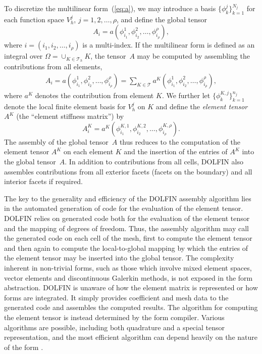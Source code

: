 \documentclass[acmtoms]{acmtrans2m}
\newcommand{\dolfin}{DOLFIN}
\begin{document}
To discretize the multilinear form~(\ref{eq:a}), we may introduce a
basis $\{\phi^j_k\}_{k=1}^{N_j}$ for each function space $V^{j}_{h}$,
$j=1, 2, \ldots, \rho$, and define the global tensor
\begin{equation}
  A_i = a(\phi_{i_1}^1, \phi_{i_2}^2, \dots,
  \phi_{i_{\rho}}^{\rho}),
\end{equation}
where $i = (i_1, i_2, \dots, i_{\rho})$ is a multi-index.  If the
multilinear form is defined as an integral over $\Omega =
\cup_{K\in\mathcal{T}_h} K$, the tensor~$A$ may be computed by
assembling the contributions from all elements,
\begin{align}
  A_{i} = a(\phi_{i_1}^1, \phi_{i_2}^2, \dots,
  \phi_{i_{\rho}}^{\rho})
  = \sum_{K \in \mathcal{T}} a^K(\phi_{i_1}^1,
  \phi_{i_2}^2, \dots, \phi_{i_{\rho}}^{\rho}),
\end{align}
where $a^K$ denotes the contribution from element $K$. We further let
$\{\phi_k^{K,j}\}_{k=1}^{n_j}$ denote the local finite element basis
for $V^j_h$ on $K$ and define the \emph{element tensor}~$A^K$ (the
``element stiffness matrix'') by
\begin{equation}
  A_i^K = a^K(\phi_{i_1}^{K, 1},
  \phi_{i_2}^{K, 2}, \dots, \phi_{i_{\rho}}^{K, \rho}).
\end{equation}
The assembly of the global tensor~$A$ thus reduces to the computation
of the element tensor $A^K$ on each element $K$ and the insertion of
the entries of $A^K$ into the global tensor~$A$.
In addition to contributions from all cells, \dolfin{} also assembles
contributions from all exterior facets (facets on the boundary)
and all interior facets if required.

The key to the generality and efficiency of the \dolfin{} assembly
algorithm lies in the automated generation of code for the evaluation
of the element tensor. \dolfin{} relies on generated code both for the
evaluation of the element tensor and the mapping of degrees of
freedom. Thus, the assembly algorithm may call the generated code on
each cell of the mesh, first to compute the element tensor and then
again to compute the local-to-global mapping by which the entries of
the element tensor may be inserted into the global tensor.
The complexity inherent in non-trivial forms, such as those which involve
mixed element spaces, vector elements and discontinuous Galerkin methods,
is not
exposed in the form abstraction. \dolfin{} is unaware of how the
element matrix is represented or how forms are integrated. It simply
provides coefficient and mesh data to the generated code and assembles
the computed results. The algorithm for computing the element tensor
is instead determined by the form compiler. Various algorithms are
possible, including both quadrature and a special tensor
representation, and the most efficient algorithm can depend heavily on
the nature of the form \cite{kirby:2006,oelgaard:2009}.
\end{document}
